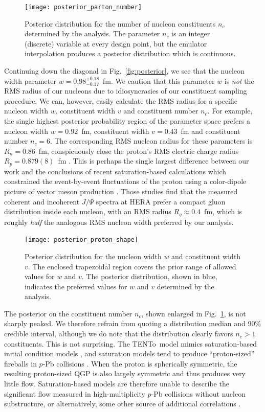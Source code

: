 \documentclass[aps,prc,reprint,amsmath,nofootinbib]{revtex4-1}
\newcommand{\trento}{T\raisebox{-0.5ex}{R}ENTo}
\begin{document}
\begin{figure}[b]
  \texttt{[image: posterior\_parton\_number]}
  \caption{
    \label{fig:posterior_parton_number}
    Posterior distribution for the number of nucleon constituents $n_c$ determined by the analysis.
    The parameter $n_c$ is an integer (discrete) variable at every design point, but the emulator interpolation produces a posterior distribution which is continuous.
  }
\end{figure}

Continuing down the diagonal in Fig.~\ref{fig:posterior}, we see that the nucleon width parameter $w=0.98_{-0.17}^{+0.18}$~fm.
We caution that this parameter $w$ is \emph{not} the RMS radius of our nucleons due to idiosyncrasies of our constituent sampling procedure.
We can, however, easily calculate the RMS radius for a specific nucleon width $w$, constituent width $v$ and constituent number $n_c$.
For example, the single highest posterior probability region of the parameter space prefers a nucleon width $w=0.92$~fm, constituent width $v=0.43$~fm and constituent number $n_c=6$.
The corresponding RMS nucleon radius for these parameters is $R_n = 0.86$~fm, conspicuously close the proton's RMS electric charge radius $R_p = 0.879(8)$~fm \cite{Bernauer:2010wm}.
This is perhaps the single largest difference between our work and the conclusions of recent saturation-based calculations which constrained the event-by-event fluctuations of the proton using a color-dipole picture of vector meson production \cite{Mantysaari:2016ykx, Mantysaari:2016jaz}.
Those studies find that the measured coherent and incoherent $J/\Psi$ spectra at HERA prefer a compact gluon distribution inside each nucleon, with an RMS radius $R_g \approx 0.4$~fm, which is roughly \emph{half} the analogous RMS nucleon width preferred by our analysis.

\begin{figure}
  \texttt{[image: posterior\_proton\_shape]}
  \caption{
    \label{fig:posterior_proton_shape}
    Posterior distribution for the nucleon width $w$ and constituent width $v$.
    The enclosed trapezoidal region covers the prior range of allowed values for $w$ and $v$.
    The posterior distribution, shown in blue, indicates the preferred values for $w$ and $v$ determined by the analysis.
  }
\end{figure}

The posterior on the constituent number $n_c$, shown enlarged in Fig.~\ref{fig:posterior_parton_number}, is not sharply peaked.
We therefore refrain from quoting a distribution median and 90\% credible interval, although we do note that the distribution clearly favors $n_c > 1$ constituents.
This is not surprising.
The \trento\ model mimics saturation-based initial condition models \cite{Bernhard:2016tnd}, and saturation models tend to produce ``proton-sized'' fireballs in $p$-Pb collisions \cite{Bzdak:2013zma}.
When the proton is spherically symmetric, the resulting proton-sized QGP is also largely symmetric and thus produces very little flow.
Saturation-based models are therefore unable to describe the significant flow measured in high-multiplicity $p$-Pb collisions without nucleon substructure, or alternatively, some other source of additional correlations \cite{Schenke:2017bog}.
\end{document}
